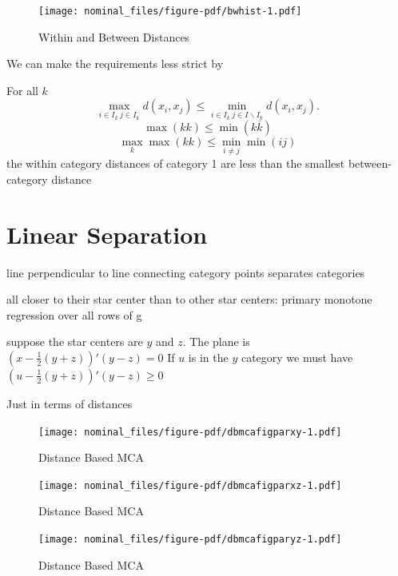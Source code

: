 \documentclass[
  12pt,
  letterpaper,
  DIV=11,
  numbers=noendperiod]{scrreprt}
\theoremstyle{remark}
\begin{document}
\begin{figure}[H]

{\centering \texttt{[image: nominal\_files/figure-pdf/bwhist-1.pdf]}

}

\caption{Within and Between Distances}

\end{figure}%

We can make the requirements less strict by

For all \(k\) \[
\max_{i\in I_k\ j\in I_k}d(x_i,x_j)\leq\min_{i\in I_k\ j\in I\backslash I_k}d(x_i,x_j).
\] \[
\max(kk)\leq\min(k\overline{k})
\] \[
\max_k\max(kk)\leq\min_{i\not= j}\min(ij)
\] the within category distances of category 1 are less than the
smallest between-category distance

\section{Linear Separation}\label{linear-separation}

line perpendicular to line connecting category points separates
categories

all closer to their star center than to other star centers: primary
monotone regression over all rows of g

suppose the star centers are \(y\) and \(z\). The plane is
\((x-\frac12(y+z))'(y-z)=0\) If \(u\) is in the \(y\) category we must
have \((u-\frac12(y+z))'(y-z)\geq 0\)

Just in terms of distances

\begin{figure}[H]

{\centering \texttt{[image: nominal\_files/figure-pdf/dbmcafigparxy-1.pdf]}

}

\caption{Distance Based MCA}

\end{figure}%

\begin{figure}[H]

{\centering \texttt{[image: nominal\_files/figure-pdf/dbmcafigparxz-1.pdf]}

}

\caption{Distance Based MCA}

\end{figure}%

\begin{figure}[H]

{\centering \texttt{[image: nominal\_files/figure-pdf/dbmcafigparyz-1.pdf]}

}

\caption{Distance Based MCA}

\end{figure}%
\end{document}
